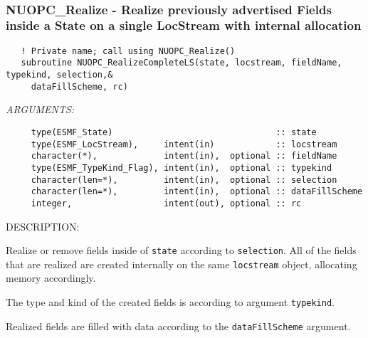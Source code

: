 \mbox{}\hrulefill\ 
 
\subsubsection [NUOPC\_Realize] {NUOPC\_Realize - Realize previously advertised Fields inside a State on a single LocStream with internal allocation}


\begin{verbatim}   ! Private name; call using NUOPC_Realize()
   subroutine NUOPC_RealizeCompleteLS(state, locstream, fieldName, typekind, selection,&
     dataFillScheme, rc)\end{verbatim}{\em ARGUMENTS:}
\begin{verbatim}     type(ESMF_State)                                :: state
     type(ESMF_LocStream),     intent(in)            :: locstream
     character(*),             intent(in),  optional :: fieldName
     type(ESMF_TypeKind_Flag), intent(in),  optional :: typekind
     character(len=*),         intent(in),  optional :: selection
     character(len=*),         intent(in),  optional :: dataFillScheme    
     integer,                  intent(out), optional :: rc\end{verbatim}
{\sf DESCRIPTION:\\ }


     \label{NUOPC_RealizeCompleteLS}
  
     Realize or remove fields inside of {\tt state} according to {\tt selection}.
     All of the fields that are realized are created internally on the same 
     {\tt locstream} object, allocating memory accordingly.
  
     The type and kind of the created fields is according to argument 
     {\tt typekind}.
  
     Realized fields are filled with data according to the {\tt dataFillScheme}
     argument.
  
